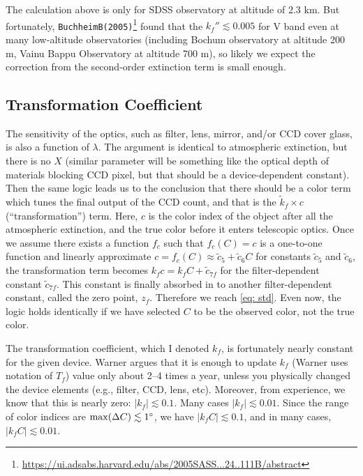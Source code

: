 The calculation above is only for SDSS observatory at altitude of 2.3 km. But fortunately, \texttt{BuchheimB(2005)}\footnote{\url{https://ui.adsabs.harvard.edu/abs/2005SASS...24..111B/abstract}} found that the $ k_f'' \lesssim 0.005 $ for V band even at many low-altitude observatories (including Bochum observatory at altitude 200 m, Vainu Bappu Observatory at altitude 700 m), so likely we expect the correction from the second-order extinction term is small enough.


\subsection{Transformation Coefficient}
The sensitivity of the optics, such as filter, lens, mirror, and/or CCD cover glass, is also a function of $ \lambda $. The argument is identical to atmospheric extinction, but there is no $ X $ (similar parameter will be something like the optical depth of materials blocking CCD pixel, but that should be a device-dependent constant). Then the same logic leads us to the conclusion that there should be a color term which tunes the final output of the CCD count, and that is the $ \tilde{k}_f \times c $ (``transformation'') term. Here, $ c $ is the color index of the object after all the atmospheric extinction, and the true color before it enters telescopic optics. Once we assume there exists a function $ f_c $ such that $ f_c(C) = c $ is a one-to-one function and linearly approximate $ c = f_c(C) \approx \tilde{c}_5 + \tilde{c}_6 C $ for constants $ \tilde{c}_5 $ and $ \tilde{c}_6 $, the transformation term becomes $ k_f c = k_f C + \tilde{c}_{7f} $ for the filter-dependent constant $ \tilde{c}_{7f} $. This constant is finally absorbed in to another filter-dependent constant, called the zero point, $ z_f $. Therefore we reach \cref{eq: std}. Even now, the logic holds identically if we have selected $ C $ to be the observed color, not the true color. 

The transformation coefficient, which I denoted $ k_f $, is fortunately nearly constant for the given device. Warner argues that it is enough to update $ k_f $ (Warner uses notation of $ T_f $) value only about 2--4 times a year, unless you physically changed the device elements (e.g., filter, CCD, lens, etc). Moreover, from experience, we know that this is nearly zero: $ |k_f| \lesssim 0.1 $. Many cases $ |k_f| \lesssim 0.01 $. Since the range of color indices are $ \mathrm{max}(\Delta C) \lesssim \m{1} $, we have $ |k_f C| \lesssim 0.1 $, and in many cases, $ |k_f C| \lesssim 0.01 $.


